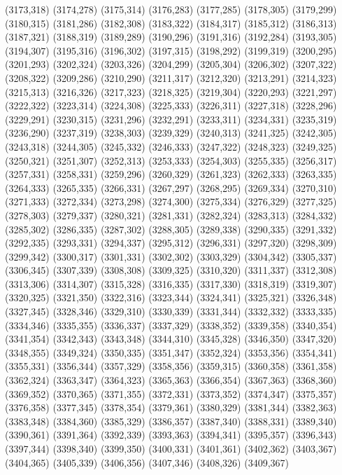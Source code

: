 (3173,318)
(3174,278)
(3175,314)
(3176,283)
(3177,285)
(3178,305)
(3179,299)
(3180,315)
(3181,286)
(3182,308)
(3183,322)
(3184,317)
(3185,312)
(3186,313)
(3187,321)
(3188,319)
(3189,289)
(3190,296)
(3191,316)
(3192,284)
(3193,305)
(3194,307)
(3195,316)
(3196,302)
(3197,315)
(3198,292)
(3199,319)
(3200,295)
(3201,293)
(3202,324)
(3203,326)
(3204,299)
(3205,304)
(3206,302)
(3207,322)
(3208,322)
(3209,286)
(3210,290)
(3211,317)
(3212,320)
(3213,291)
(3214,323)
(3215,313)
(3216,326)
(3217,323)
(3218,325)
(3219,304)
(3220,293)
(3221,297)
(3222,322)
(3223,314)
(3224,308)
(3225,333)
(3226,311)
(3227,318)
(3228,296)
(3229,291)
(3230,315)
(3231,296)
(3232,291)
(3233,311)
(3234,331)
(3235,319)
(3236,290)
(3237,319)
(3238,303)
(3239,329)
(3240,313)
(3241,325)
(3242,305)
(3243,318)
(3244,305)
(3245,332)
(3246,333)
(3247,322)
(3248,323)
(3249,325)
(3250,321)
(3251,307)
(3252,313)
(3253,333)
(3254,303)
(3255,335)
(3256,317)
(3257,331)
(3258,331)
(3259,296)
(3260,329)
(3261,323)
(3262,333)
(3263,335)
(3264,333)
(3265,335)
(3266,331)
(3267,297)
(3268,295)
(3269,334)
(3270,310)
(3271,333)
(3272,334)
(3273,298)
(3274,300)
(3275,334)
(3276,329)
(3277,325)
(3278,303)
(3279,337)
(3280,321)
(3281,331)
(3282,324)
(3283,313)
(3284,332)
(3285,302)
(3286,335)
(3287,302)
(3288,305)
(3289,338)
(3290,335)
(3291,332)
(3292,335)
(3293,331)
(3294,337)
(3295,312)
(3296,331)
(3297,320)
(3298,309)
(3299,342)
(3300,317)
(3301,331)
(3302,302)
(3303,329)
(3304,342)
(3305,337)
(3306,345)
(3307,339)
(3308,308)
(3309,325)
(3310,320)
(3311,337)
(3312,308)
(3313,306)
(3314,307)
(3315,328)
(3316,335)
(3317,330)
(3318,319)
(3319,307)
(3320,325)
(3321,350)
(3322,316)
(3323,344)
(3324,341)
(3325,321)
(3326,348)
(3327,345)
(3328,346)
(3329,310)
(3330,339)
(3331,344)
(3332,332)
(3333,335)
(3334,346)
(3335,355)
(3336,337)
(3337,329)
(3338,352)
(3339,358)
(3340,354)
(3341,354)
(3342,343)
(3343,348)
(3344,310)
(3345,328)
(3346,350)
(3347,320)
(3348,355)
(3349,324)
(3350,335)
(3351,347)
(3352,324)
(3353,356)
(3354,341)
(3355,331)
(3356,344)
(3357,329)
(3358,356)
(3359,315)
(3360,358)
(3361,358)
(3362,324)
(3363,347)
(3364,323)
(3365,363)
(3366,354)
(3367,363)
(3368,360)
(3369,352)
(3370,365)
(3371,355)
(3372,331)
(3373,352)
(3374,347)
(3375,357)
(3376,358)
(3377,345)
(3378,354)
(3379,361)
(3380,329)
(3381,344)
(3382,363)
(3383,348)
(3384,360)
(3385,329)
(3386,357)
(3387,340)
(3388,331)
(3389,340)
(3390,361)
(3391,364)
(3392,339)
(3393,363)
(3394,341)
(3395,357)
(3396,343)
(3397,344)
(3398,340)
(3399,350)
(3400,331)
(3401,361)
(3402,362)
(3403,367)
(3404,365)
(3405,339)
(3406,356)
(3407,346)
(3408,326)
(3409,367)
